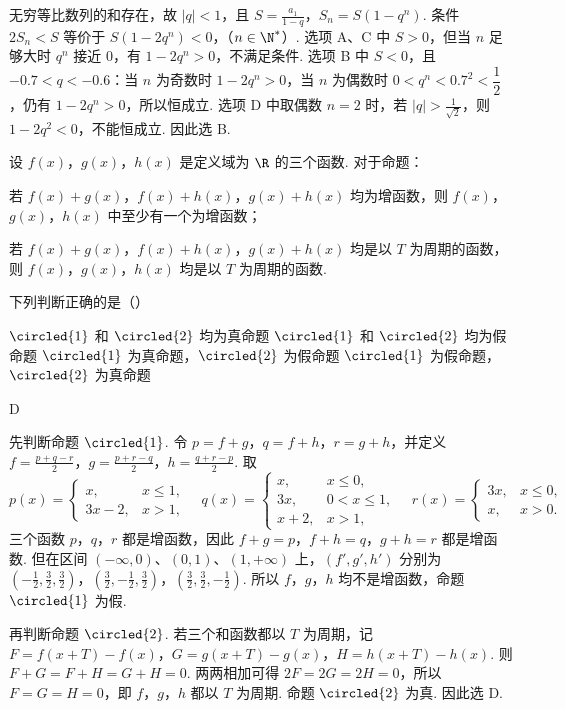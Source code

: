 \begin{solution}
无穷等比数列的和存在，故 \(|q|<1\)，且
\(S=\frac{a_1}{1-q}\)，\(S_n=S(1-q^n)\).
条件 \(2S_n<S\) 等价于
\(S(1-2q^n)<0\)，（\(n\in\N^*\)）.
选项 A、C 中 \(S>0\)，但当 \(n\) 足够大时 \(q^n\) 接近 \(0\)，有 \(1-2q^n>0\)，不满足条件. 选项 B 中 \(S<0\)，且 \(-0.7<q<-0.6\)：当 \(n\) 为奇数时 \(1-2q^n>0\)，当 \(n\) 为偶数时 \(0<q^n<0.7^2<\dfrac12\)，仍有 \(1-2q^n>0\)，所以恒成立. 选项 D 中取偶数 \(n=2\) 时，若 \(|q|>\frac{1}{\sqrt2}\)，则 \(1-2q^2<0\)，不能恒成立. 因此选 B.
\end{solution}

\begin{problem}
设 \(f(x)\)，\(g(x)\)，\(h(x)\) 是定义域为 \(\R\) 的三个函数. 对于命题：
\begin{circlelist}
\item 若 \(f(x)+g(x)\)，\(f(x)+h(x)\)，\(g(x)+h(x)\) 均为增函数，则 \(f(x)\)，\(g(x)\)，\(h(x)\) 中至少有一个为增函数；
\item 若 \(f(x)+g(x)\)，\(f(x)+h(x)\)，\(g(x)+h(x)\) 均是以 \(T\) 为周期的函数，则 \(f(x)\)，\(g(x)\)，\(h(x)\) 均是以 \(T\) 为周期的函数.
\end{circlelist}
下列判断正确的是（\quad）

\choices
    {\(\circled{1}\) 和 \(\circled{2}\) 均为真命题}
    {\(\circled{1}\) 和 \(\circled{2}\) 均为假命题}
    {\(\circled{1}\) 为真命题，\(\circled{2}\) 为假命题}
    {\(\circled{1}\) 为假命题，\(\circled{2}\) 为真命题}
\end{problem}

\begin{answer}
D
\end{answer}

\begin{solution}
先判断命题 \(\circled{1}\). 令 \(p=f+g\)，\(q=f+h\)，\(r=g+h\)，并定义
\(f=\frac{p+q-r}{2}\)，\(g=\frac{p+r-q}{2}\)，\(h=\frac{q+r-p}{2}\).
取
\[
p(x)=\begin{cases}
x,&x\le1,\\
3x-2,&x>1,
\end{cases}\quad
q(x)=\begin{cases}
x,&x\le0,\\
3x,&0<x\le1,\\
x+2,&x>1,
\end{cases}\quad
r(x)=\begin{cases}
3x,&x\le0,\\
x,&x>0.
\end{cases}
\]
三个函数 \(p\)，\(q\)，\(r\) 都是增函数，因此 \(f+g=p\)，\(f+h=q\)，\(g+h=r\) 都是增函数. 但在区间 \((-\infty,0)\)、\((0,1)\)、\((1,+\infty)\) 上，\((f',g',h')\) 分别为
\(\left(-\frac12,\frac32,\frac32\right)\)，\(\left(\frac32,-\frac12,\frac32\right)\)，\(\left(\frac32,\frac32,-\frac12\right)\).
所以 \(f\)，\(g\)，\(h\) 均不是增函数，命题 \(\circled{1}\) 为假.

再判断命题 \(\circled{2}\). 若三个和函数都以 \(T\) 为周期，记
\(F=f(x+T)-f(x)\)，\(G=g(x+T)-g(x)\)，\(H=h(x+T)-h(x)\).
则 \(F+G=F+H=G+H=0\). 两两相加可得 \(2F=2G=2H=0\)，所以 \(F=G=H=0\)，即 \(f\)，\(g\)，\(h\) 都以 \(T\) 为周期. 命题 \(\circled{2}\) 为真. 因此选 D.
\end{solution}

